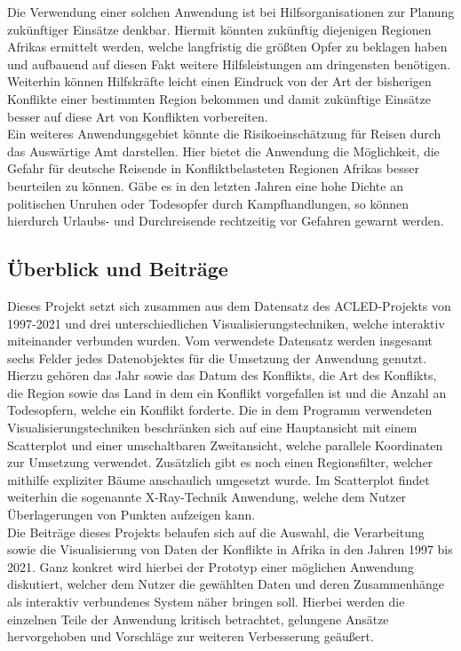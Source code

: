 \documentclass[usegeometry=true]{scrartcl}
\begin{document}
Die Verwendung einer solchen Anwendung ist bei Hilfsorganisationen zur Planung zukünftiger Einsätze denkbar. Hiermit könnten zukünftig diejenigen Regionen Afrikas ermittelt werden, welche langfristig die größten Opfer zu beklagen haben und aufbauend auf diesen Fakt weitere Hilfsleistungen am dringensten benötigen. Weiterhin können Hilfskräfte leicht einen Eindruck von der Art der bisherigen Konflikte einer bestimmten Region bekommen und damit zukünftige Einsätze besser auf diese Art von Konflikten vorbereiten.\\

Ein weiteres Anwendungsgebiet könnte die Risikoeinschätzung für Reisen durch das Auswärtige Amt \cite{aa} darstellen. Hier bietet die Anwendung die Möglichkeit, die Gefahr für deutsche Reisende in Konfliktbelasteten Regionen Afrikas besser beurteilen zu können. Gäbe es in den letzten Jahren eine hohe Dichte an politischen Unruhen oder Todesopfer durch Kampfhandlungen, so können hierdurch Urlaubs- und Durchreisende rechtzeitig vor Gefahren gewarnt werden.

\subsection{Überblick und Beiträge}
Dieses Projekt setzt sich zusammen aus dem Datensatz des ACLED-Projekts von 1997-2021 und drei unterschiedlichen Visualisierungstechniken, welche interaktiv miteinander verbunden wurden. Vom verwendete Datensatz werden insgesamt sechs Felder jedes Datenobjektes für die Umsetzung der Anwendung genutzt. Hierzu gehören das Jahr sowie das Datum des Konflikts, die Art des Konflikts, die Region sowie das Land in dem ein Konflikt vorgefallen ist und die Anzahl an Todesopfern, welche ein Konflikt forderte. Die in dem Programm verwendeten Visualisierungstechniken beschränken sich auf eine Hauptansicht mit einem Scatterplot und einer umschaltbaren Zweitansicht, welche parallele Koordinaten zur Umsetzung verwendet. Zusätzlich gibt es noch einen Regionsfilter, welcher mithilfe expliziter Bäume anschaulich umgesetzt wurde. Im Scatterplot findet weiterhin die sogenannte X-Ray-Technik Anwendung, welche dem Nutzer Überlagerungen von Punkten aufzeigen kann. \\

Die Beiträge dieses Projekts belaufen sich auf die Auswahl, die Verarbeitung sowie die Visualisierung von Daten der Konflikte in Afrika in den Jahren 1997 bis 2021. Ganz konkret wird hierbei der Prototyp einer möglichen Anwendung diskutiert, welcher dem Nutzer die gewählten Daten und deren Zusammenhänge als interaktiv verbundenes System näher bringen soll. Hierbei werden die einzelnen Teile der Anwendung kritisch betrachtet, gelungene Ansätze hervorgehoben und Vorschläge zur weiteren Verbesserung geäußert.
\end{document}
